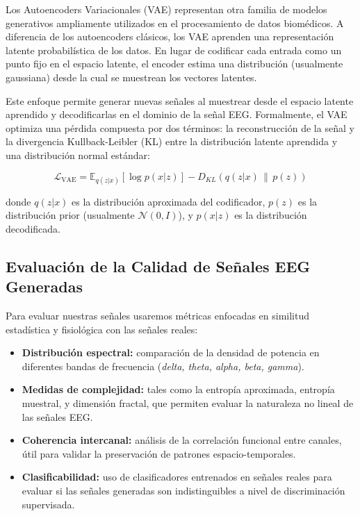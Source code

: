 Los Autoencoders Variacionales (VAE) representan otra familia de modelos generativos ampliamente utilizados en el procesamiento de datos biomédicos. A diferencia de los autoencoders clásicos, los VAE aprenden una representación latente probabilística de los datos. En lugar de codificar cada entrada como un punto fijo en el espacio latente, el encoder estima una distribución (usualmente gaussiana) desde la cual se muestrean los vectores latentes.

Este enfoque permite generar nuevas señales al muestrear desde el espacio latente aprendido y decodificarlas en el dominio de la señal EEG. Formalmente, el VAE optimiza una pérdida compuesta por dos términos: la reconstrucción de la señal y la divergencia Kullback-Leibler (KL) entre la distribución latente aprendida y una distribución normal estándar:

\begin{equation}
\mathcal{L}_{\text{VAE}} = \mathbb{E}_{q(z|x)}[\log p(x|z)] - D_{KL}(q(z|x)\,\|\,p(z))
\end{equation}

donde $q(z|x)$ es la distribución aproximada del codificador, $p(z)$ es la distribución prior (usualmente $\mathcal{N}(0, I)$), y $p(x|z)$ es la distribución decodificada.

\subsection{Evaluación de la Calidad de Señales EEG Generadas}

Para evaluar nuestras señales usaremos métricas enfocadas en similitud estadística y fisiológica con las señales reales:

\begin{itemize}
    \item \textbf{Distribución espectral:} comparación de la densidad de potencia en diferentes bandas de frecuencia (\textit{delta, theta, alpha, beta, gamma}).
    \item \textbf{Medidas de complejidad:} tales como la entropía aproximada, entropía muestral, y dimensión fractal, que permiten evaluar la naturaleza no lineal de las señales EEG.
    \item \textbf{Coherencia intercanal:} análisis de la correlación funcional entre canales, útil para validar la preservación de patrones espacio-temporales.
    \item \textbf{Clasificabilidad:} uso de clasificadores entrenados en señales reales para evaluar si las señales generadas son indistinguibles a nivel de discriminación supervisada.
\end{itemize}


